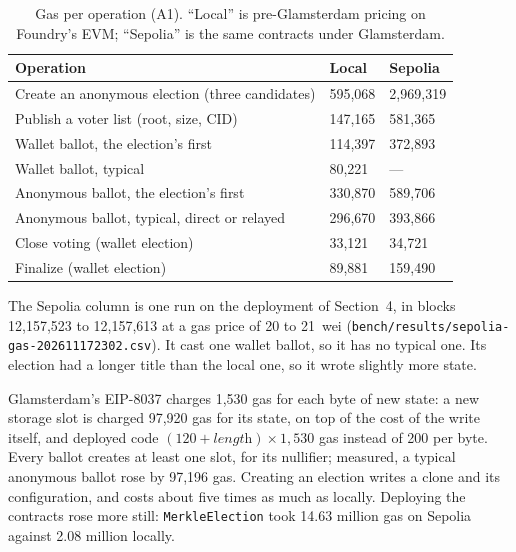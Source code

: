 \begin{table}[htbp]
  \centering
  \caption{Gas per operation (A1). ``Local'' is pre-Glamsterdam pricing on
    Foundry's EVM; ``Sepolia'' is the same contracts under Glamsterdam.}
  \label{tab:a1}
  \small
  \begin{tabular}{@{}L{8.2cm}R{2.2cm}R{2.2cm}@{}}
    \toprule
    \textbf{Operation} & \textbf{Local} & \textbf{Sepolia} \\
    \midrule
    Create an anonymous election (three candidates)          & 595,068 & 2,969,319 \\
    Publish a voter list (root, size, CID)                   & 147,165 & 581,365 \\
    Wallet ballot, the election's first                      & 114,397 & 372,893 \\
    Wallet ballot, typical                                   & 80,221  & --- \\
    Anonymous ballot, the election's first                   & 330,870 & 589,706 \\
    Anonymous ballot, typical, direct or relayed             & 296,670 & 393,866 \\
    Close voting (wallet election)                           & 33,121  & 34,721 \\
    Finalize (wallet election)                               & 89,881  & 159,490 \\
    \bottomrule
  \end{tabular}
\end{table}

The Sepolia column is one run on the deployment of Section~4, in blocks
12,157,523 to 12,157,613 at a gas price of 20 to 21~wei
(\nolinkurl{bench/results/sepolia-gas-202611172302.csv}). It cast one wallet
ballot, so it has no typical one. Its election had a longer title than the
local one, so it wrote slightly more state.

Glamsterdam's EIP-8037 charges 1,530 gas for each byte of new state: a new
storage slot is charged 97,920 gas for its state, on top of the cost of the
write itself, and deployed code $(120 + \textit{length}) \times 1{,}530$ gas
instead of 200 per byte. Every ballot creates at least one slot, for its
nullifier; measured, a typical anonymous ballot rose by 97,196 gas. Creating an
election writes a clone and its configuration, and costs about five times as
much as locally. Deploying the contracts rose more still: \texttt{MerkleElection} took
14.63 million gas on Sepolia against 2.08 million locally.

